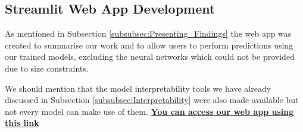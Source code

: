 
\subsection{Streamlit Web App Development}

As mentioned in Subsection \ref{subsubsec:Presenting_Findings} the web app was created to summarise our work and to allow users to perform predictions using our trained models, excluding the neural networks which could not be provided due to size constraints.

We should mention that the model interpretability tools we have already discussed in Subsection \ref{subsubsec:Interpretability} were also made available but not every model can make use of them. \href{https://alphafold-dataset-drug-binding-prediction.streamlit.app/}{\textbf{You can access our web app using this link}}